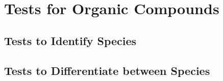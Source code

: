 \documentclass[../main]{subfiles}
\begin{document}
\section{Tests for Organic Compounds}

	\subsection{Tests to Identify Species}

	\subsection{Tests to Differentiate between Species}
\end{document}
